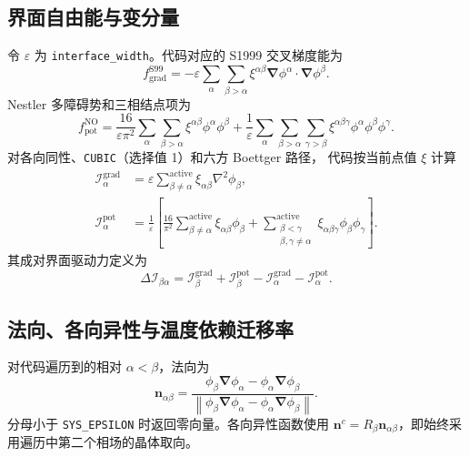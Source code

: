 \documentclass[UTF8,a4paper,11pt]{ctexart}
\newcommand{\grad}{\bm{\nabla}}
\newcommand{\vct}[1]{\bm{#1}}
\newcommand{\code}[1]{\texttt{#1}}
\begin{document}
\subsection{界面自由能与变分量}

令 $\varepsilon$ 为 \code{interface\_width}。代码对应的 S1999 交叉梯度能为
\begin{equation}
 f_{\mathrm{grad}}^{\mathrm{S99}}
 =-\varepsilon\sum_\alpha\sum_{\beta>\alpha}
 \xi^{\alpha\beta}\grad\phi^\alpha\!\cdot\!\grad\phi^\beta .
 \label{eq:s99}
\end{equation}
Nestler 多障碍势和三相结点项为
\begin{equation}
 f_{\mathrm{pot}}^{\mathrm{NO}}
 =\frac{16}{\varepsilon\pi^2}
 \sum_\alpha\sum_{\beta>\alpha}\xi^{\alpha\beta}\phi^\alpha\phi^\beta
 +\frac{1}{\varepsilon}
 \sum_\alpha\sum_{\beta>\alpha}\sum_{\gamma>\beta}
 \xi^{\alpha\beta\gamma}\phi^\alpha\phi^\beta\phi^\gamma .
 \label{eq:no}
\end{equation}
对各向同性、\code{CUBIC}（选择值 1）和六方 Boettger 路径，
代码按当前点值 $\xi$ 计算
\begin{align}
 \mathcal I_\alpha^{\mathrm{grad}}
 &=\varepsilon\sum_{\beta\ne\alpha}^{\mathrm{active}}
   \xi_{\alpha\beta}\nabla^2\phi_\beta,\\
 \mathcal I_\alpha^{\mathrm{pot}}
 &=\frac{1}{\varepsilon}\left[
   \frac{16}{\pi^2}\sum_{\beta\ne\alpha}^{\mathrm{active}}
   \xi_{\alpha\beta}\phi_\beta
   +\sum_{\substack{\beta<\gamma\\\beta,\gamma\ne\alpha}}^{\mathrm{active}}
   \xi_{\alpha\beta\gamma}\phi_\beta\phi_\gamma\right].
\end{align}
其成对界面驱动力定义为
\begin{equation}
 \Delta\mathcal I_{\beta\alpha}
 =\mathcal I_\beta^{\mathrm{grad}}+\mathcal I_\beta^{\mathrm{pot}}
 -\mathcal I_\alpha^{\mathrm{grad}}-\mathcal I_\alpha^{\mathrm{pot}}.
\end{equation}

\subsection{法向、各向异性与温度依赖迁移率}

对代码遍历到的相对 $\alpha<\beta$，法向为
\begin{equation}
 \vct n_{\alpha\beta}
 =\frac{\phi_\beta\grad\phi_\alpha-
             \phi_\alpha\grad\phi_\beta}
 {\left\lVert\phi_\beta\grad\phi_\alpha-
             \phi_\alpha\grad\phi_\beta\right\rVert}.
 \label{eq:normal}
\end{equation}
分母小于 \code{SYS\_EPSILON} 时返回零向量。各向异性函数使用
$\vct n^c=R_\beta\vct n_{\alpha\beta}$，即始终采用遍历中第二个相场的晶体取向。
\end{document}
